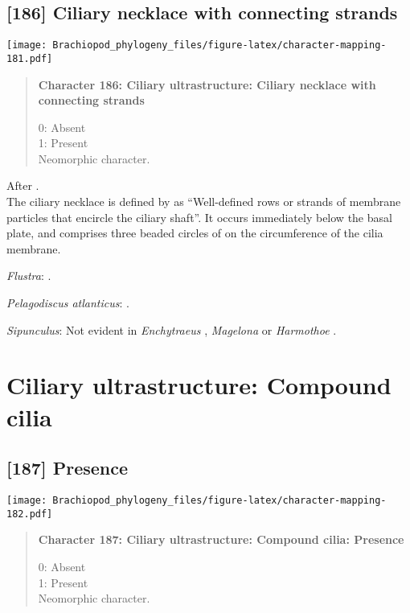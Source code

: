\documentclass[openany]{book}
\theoremstyle{definition}
\theoremstyle{definition}
\theoremstyle{definition}
\theoremstyle{remark}
\begin{document}
\subsection*{{[}186{]} Ciliary necklace with connecting
strands}\label{ciliary-necklace-with-connecting-strands}

\texttt{[image: Brachiopod\_phylogeny\_files/figure-latex/character-mapping-181.pdf]}

\begin{quote}
\textbf{Character 186: Ciliary ultrastructure: Ciliary necklace with
connecting strands}

0: Absent\\
1: Present\\
Neomorphic character.
\end{quote}

After \citet{Lundin2009}.\\
The ciliary necklace is defined by \citet{Gilula1972} as ``Well-defined
rows or strands of membrane particles that encircle the ciliary shaft''.
It occurs immediately below the basal plate, and comprises three beaded
circles of on the circumference of the cilia membrane.

\hypertarget{Flustra-coding-186}{}
\emph{Flustra}: \citet{Reed1982}.

\hypertarget{Pelagodiscus_atlanticus-coding-186}{}
\emph{Pelagodiscus atlanticus}: \citep{Luter1995}.

\hypertarget{Sipunculus-coding-186}{}
\emph{Sipunculus}: Not evident in \emph{Enchytraeus} \citep{Reger1967},
\emph{Magelona} \citep{Bartolomaeus1995} or \emph{Harmothoe}
\citep{Holborow1969}.

\section{Ciliary ultrastructure: Compound
cilia}\label{ciliary-ultrastructure-compound-cilia}

\subsection*{{[}187{]} Presence}\label{presence-3}

\texttt{[image: Brachiopod\_phylogeny\_files/figure-latex/character-mapping-182.pdf]}

\begin{quote}
\textbf{Character 187: Ciliary ultrastructure: Compound cilia: Presence}

0: Absent\\
1: Present\\
Neomorphic character.
\end{quote}
\end{document}
